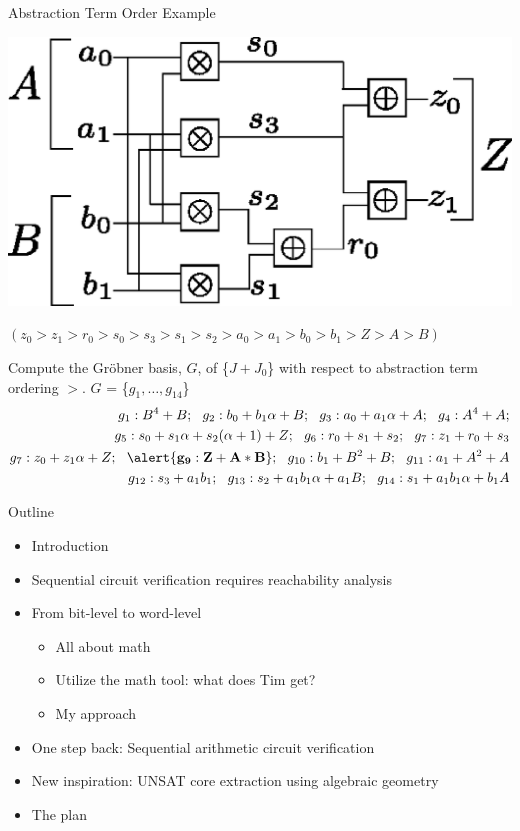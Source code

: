 \documentclass[xcolor=dvipsnames]{beamer}
\newcommand{\Grobner}{Gr\"{o}bner\xspace}
\newcommand{\bi}{\begin{itemize}}
\newcommand{\ei}{\end{itemize}}
\begin{document}
\begin{frame}{\large{Abstraction Term Order Example}}

\centerline{
\includegraphics[scale=0.4]{2bitmult.eps}
}
{\bf $(z_0 > z_1 > r_0 > s_0 > s_3 > s_1 > s_2 > a_0 > a_1 >  b_0 > b_1 > Z > A > B)$}

Compute the \Grobner basis, $G$, of \{$J + J_0$\} with respect to abstraction term ordering $>$.
$G$ = \{$g_1, \dots, g_{14}$\}
\begin{align*}
g_1: B^4+B; ~~g_2: b_0+b_1 \alpha + B; ~~g_3: a_0+a_1 \alpha + A; ~~g_4: A^4+A; \nonumber \\
g_5: s_0+s_1 \alpha + s_2 (\alpha + 1) + Z; ~~g_6: r_0+s_1+s_2; ~~g_7: z_1+r_0+s_3 \nonumber \\
g_7: z_0+z_1 \alpha +Z; ~~\alert{\bf g_9: Z+A*B} ; ~~g_{10}: b_1+B^2+B; ~~g_{11}: a_1+A^2+A \nonumber \\
g_{12}: s_3+a_1 b_1; ~~g_{13}: s_2+a_1 b_1 \alpha +a_1 B; ~~g_{14}: s_1+a_1 b_1 \alpha +b_1 A  \nonumber
\end{align*}

\end{frame}

\begin{frame}{\large{Outline}}
\bi
\item Introduction
\item Sequential circuit verification requires reachability analysis
\item From bit-level to word-level
	\bi
	\item All about math
	\item Utilize the math tool: what does Tim get?
	\item \alert{My approach}
	\ei
\item One step back: Sequential arithmetic circuit verification
\item New inspiration: UNSAT core extraction using algebraic geometry
\item The plan
\ei
\end{frame}
\end{document}
